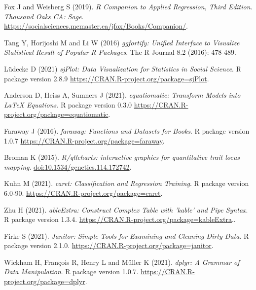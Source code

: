 \documentclass[letterpaper,8pt,twocolumn,twoside,]{pinp}
\begin{document}
\begin{thebibliography}{3}
Fox J and Weisberg S (2019).
\newblock \emph{R Companion to Applied
Regression, Third Edition. Thousand Oaks CA: Sage}.
\newblock \urlprefix\url{https://socialsciences.mcmaster.ca/jfox/Books/Companion/}.

Tang Y, Horijoshi M and Li W (2016)
\newblock \emph{ggfortify: Unified
Interface to Visualize Statistical Result of Popular R Packages}.
\newblock The R Journal 8.2 (2016): 478-489.

\bibitem[{Lüdecke D (2021)}]{}
Lüdecke D (2021)
\newblock \emph{sjPlot: Data Visualization for Statistics in
Social Science}.
\newblock R package version 2.8.9 \urlprefix\url{https://CRAN.R-project.org/package=sjPlot}.

Anderson D, Heiss A, Sumners J (2021).
\newblock \emph{equatiomatic: Transform Models into LaTeX Equations}.
\newblock R package version 0.3.0 \urlprefix\url{https://CRAN.R-project.org/package=equatiomatic}.

\bibitem[{Faraway J (2016)}]{}
Faraway J (2016).
\newblock \emph{faraway: Functions and Datasets for Books}.
\newblock R package version 1.0.7 \urlprefix\url{https://CRAN.R-project.org/package=faraway}.

\bibitem[{Broman K(2015)}]{}
Broman K (2015).
\newblock \emph{R/qtlcharts: interactive graphics for
quantitative trait locus mapping}.
\newblock \urlprefix\url{doi:10.1534/genetics.114.172742}.

\bibitem[{Kuhn M (2021)}]{}
Kuhn M (2021).
\newblock \emph{caret: Classification and Regression Training}.
\newblock R package version 6.0-90. \urlprefix\url{https://CRAN.R-project.org/package=caret}.

\bibitem[{Zhu H (2021)}]{}
Zhu H (2021).
\newblock \emph{ableExtra: Construct Complex Table with 'kable' and Pipe Syntax}.
\newblock R package version 1.3.4. \urlprefix\url{https://CRAN.R-project.org/package=kableExtra}..

\bibitem[{Firke S (2021)}]{}
Firke S (2021).
\newblock \emph{Janitor: Simple Tools for Examining and Cleaning Dirty Data}.
\newblock R package version 2.1.0. \urlprefix\url{https://CRAN.R-project.org/package=janitor}.

Wickham H, François R, Henry L and Müller K (2021).
\newblock \emph{dplyr: A Grammar of Data Manipulation}.
\newblock R package version 1.0.7. \urlprefix\url{https://CRAN.R-project.org/package=dplyr}.


\end{thebibliography}
\end{document}
